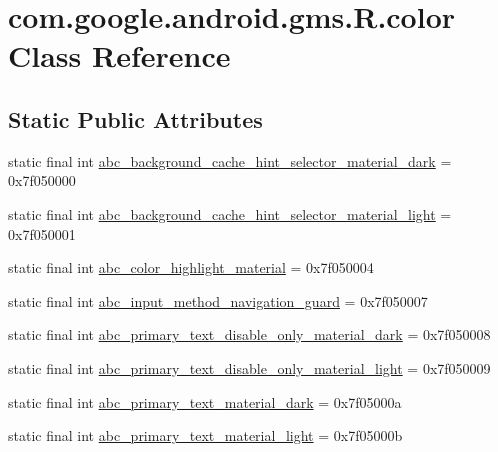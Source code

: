\hypertarget{classcom_1_1google_1_1android_1_1gms_1_1R_1_1color}{}\section{com.\+google.\+android.\+gms.\+R.\+color Class Reference}
\label{classcom_1_1google_1_1android_1_1gms_1_1R_1_1color}
\subsection*{Static Public Attributes}
\begin{DoxyCompactItemize}
\item 
static final int \mbox{\hyperlink{classcom_1_1google_1_1android_1_1gms_1_1R_1_1color_af6bcd678875b168cc97b6cbf995c3317}{abc\+\_\+background\+\_\+cache\+\_\+hint\+\_\+selector\+\_\+material\+\_\+dark}} = 0x7f050000
\item 
static final int \mbox{\hyperlink{classcom_1_1google_1_1android_1_1gms_1_1R_1_1color_a5ca3efacdbafae517d5d2dffb8932961}{abc\+\_\+background\+\_\+cache\+\_\+hint\+\_\+selector\+\_\+material\+\_\+light}} = 0x7f050001
\item 
static final int \mbox{\hyperlink{classcom_1_1google_1_1android_1_1gms_1_1R_1_1color_a2bead477b34822d995952e45b968b802}{abc\+\_\+color\+\_\+highlight\+\_\+material}} = 0x7f050004
\item 
static final int \mbox{\hyperlink{classcom_1_1google_1_1android_1_1gms_1_1R_1_1color_ae27cb6dcc3ba4dc6c6fb500c2f5dd830}{abc\+\_\+input\+\_\+method\+\_\+navigation\+\_\+guard}} = 0x7f050007
\item 
static final int \mbox{\hyperlink{classcom_1_1google_1_1android_1_1gms_1_1R_1_1color_acad0e6d3e4c288eca87027090c032792}{abc\+\_\+primary\+\_\+text\+\_\+disable\+\_\+only\+\_\+material\+\_\+dark}} = 0x7f050008
\item 
static final int \mbox{\hyperlink{classcom_1_1google_1_1android_1_1gms_1_1R_1_1color_a9741823c11fbfa9ee03c11a09946665d}{abc\+\_\+primary\+\_\+text\+\_\+disable\+\_\+only\+\_\+material\+\_\+light}} = 0x7f050009
\item 
static final int \mbox{\hyperlink{classcom_1_1google_1_1android_1_1gms_1_1R_1_1color_aa517219f74ba423daf9296bbbad2bce0}{abc\+\_\+primary\+\_\+text\+\_\+material\+\_\+dark}} = 0x7f05000a
\item 
static final int \mbox{\hyperlink{classcom_1_1google_1_1android_1_1gms_1_1R_1_1color_aa76ef86ba6591a2469d6354a9d8ddf26}{abc\+\_\+primary\+\_\+text\+\_\+material\+\_\+light}} = 0x7f05000b

\end{DoxyCompactItemize}
